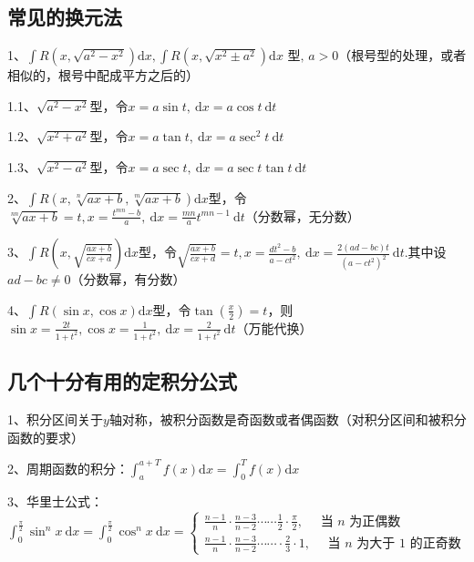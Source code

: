 \subsection{常见的换元法}

1、$\int R\left(x, \sqrt{a^{2}-x^{2}}\right) \mathrm{d} x, \int R\left(x, \sqrt{x^{2} \pm a^{2}}\right) \mathrm{d} x \text { 型, } a>0$（根号型的处理，或者相似的，根号中配成平方之后的）

1.1、$\sqrt{a^{2}-x^{2}}$型，令$x=a \sin t, \mathrm{~d} x=a \cos t \mathrm{~d} t$

1.2、$\sqrt{x^{2}+a^{2}}$型，令$x=a \tan t, \mathrm{~d} x=a \sec ^{2} t \mathrm{~d} t$

1.3、$\sqrt{x^{2}-a^{2}}$型，令$x=a \sec t, \mathrm{~d} x=a \sec t \tan t \mathrm{~d} t$

2、$\int R(x, \sqrt[n]{a x+b}, \sqrt[m]{a x+b}) \mathrm{d} x$型，令$\sqrt[n n]{a x+b}=t, x=\frac{t^{m n}-b}{a}, \mathrm{~d} x=\frac{m n}{a} t^{m n-1} \mathrm{~d} t$（分数幂，无分数）

3、$\int R\left(x, \sqrt{\frac{a x+b}{c x+d}}\right) \mathrm{d} x$型，令$\sqrt{\frac{a x+b}{c x+d}}=t, x=\frac{d t^{2}-b}{a-c t^{2}}, \mathrm{~d} x=\frac{2(a d-b c) t}{\left(a-c t^{2}\right)^{2}} \mathrm{~d} t .$其中设$a d-b c \neq 0$（分数幂，有分数）

4、$\int R(\sin x, \cos x) \mathrm{d} x$型，令$\tan({\frac{x}{2}})=t$，则$\sin x=\frac{2 t}{1+t^{2}}, \cos x=\frac{1}{1+t^{2}}, \mathrm{~d} x=\frac{2}{1+t^{2}} \mathrm{~d} t$（万能代换）



\subsection{几个十分有用的定积分公式}

1、积分区间关于$y$轴对称，被积分函数是奇函数或者偶函数（对积分区间和被积分函数的要求）

2、周期函数的积分：$\int_{a}^{a+T} f(x) \mathrm{d} x=\int_{0}^{T} f(x) \mathrm{d} x$

3、华里士公式：$\int_{0}^{\frac{\pi}{2}} \sin ^{n} x \mathrm{~d} x=\int_{0}^{\frac{\pi}{2}} \cos ^{n} x \mathrm{~d} x=\left\{\begin{array}{l}\frac{n-1}{n} \cdot \frac{n-3}{n-2} \cdots \cdots \frac{1}{2} \cdot \frac{\pi}{2}, \quad \text { 当 } n \text { 为正偶数 } \\\frac{n-1}{n} \cdot \frac{n-3}{n-2} \cdots \cdots \cdot \frac{2}{3} \cdot 1, \quad \text { 当 } n \text { 为大于 } 1 \text { 的正奇数 }\end{array}\right.$

